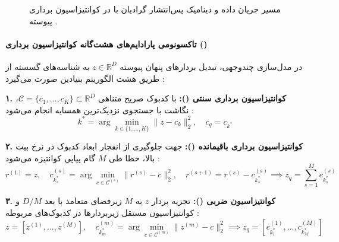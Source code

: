 \begin{figure}[htbp]
{%
}
\caption{مسیر جریان داده و دینامیک پس‌انتشار گرادیان با  در کوانتیزاسیون برداری پیوسته \cite{li2025discrete, jia2025principles}.}
\label{fig:vq_pipeline}
\end{figure}

\paragraph*{تاکسونومی پارادایم‌های هشت‌گانه کوانتیزاسیون برداری ()}
در مدل‌سازی چندوجهی، تبدیل بردارهای پنهان پیوسته $z \in \mathbb{R}^D$ به شناسه‌های گسسته از طریق هشت الگوریتم بنیادین صورت می‌گیرد \cite{li2025discrete, jia2025principles}:

\textbf{۱. کوانتیزاسیون برداری سنتی ():}
با کدبوک صریح متناهی $\mathcal{C} = \{c_1, \dots, c_K\} \subset \mathbb{R}^D$، نگاشت با جستجوی نزدیک‌ترین همسایه انجام می‌شود \cite{van2017neural}:
\begin{equation}
    k^* = \arg\min_{k \in \{1, \dots, K\}} \|z - c_k\|_2^2, \quad c_q = c_{k^*}
\end{equation}

\textbf{۲. کوانتیزاسیون برداری باقیمانده ():}
جهت جلوگیری از انفجار ابعاد کدبوک در نرخ بیت بالا، خطا طی $M$ گام پیاپی کوانتیزه می‌شود \cite{juang1982multiple}:
\begin{equation}
    r^{(1)} = z, \quad c_{k_s^*}^{(s)} = \arg\min_{c \in \mathcal{C}^{(s)}} \|r^{(s)} - c\|_2^2, \quad r^{(s+1)} = r^{(s)} - c_{k_s^*}^{(s)} \implies z_q = \sum_{s=1}^M c_{k_s^*}^{(s)}
\end{equation}

\textbf{۳. کوانتیزاسیون ضربی ():}
تجزیه بردار $z$ به $M$ زیرفضای متعامد با بعد $D/M$ و کوانتیزاسیون مستقل زیربردارها در کدبوک‌های مربوطه \cite{jegou2010product}:
\begin{equation}
    z = [z^{(1)}, \dots, z^{(M)}], \quad c_{k_m^*}^{(m)} = \arg\min_{c \in \mathcal{C}^{(m)}} \|z^{(m)} - c\|_2^2 \implies z_q = [c_{k_1^*}^{(1)}, \dots, c_{k_M^*}^{(M)}]
\end{equation}

